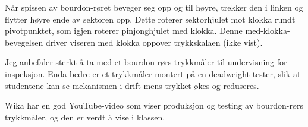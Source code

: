 





Når spissen av bourdon-røret beveger seg opp og til høyre, trekker den i linken og flytter høyre ende av sektoren opp.  Dette roterer sektorhjulet mot klokka rundt pivotpunktet, som igjen roterer pinjonghjulet med klokka.  Denne med-klokka-bevegelsen driver viseren med klokka oppover trykkskalaen (ikke vist).

Jeg anbefaler sterkt å ta med et bourdon-rørs trykkmåler til undervisning for inspeksjon.  Enda bedre er et trykkmåler montert på en deadweight-tester, slik at studentene kan se mekanismen i drift mens trykket økes og reduseres.

\vskip 10pt

Wika har en god YouTube-video som viser produksjon og testing av bourdon-rørs trykkmåler, og den er verdt å vise i klassen.


